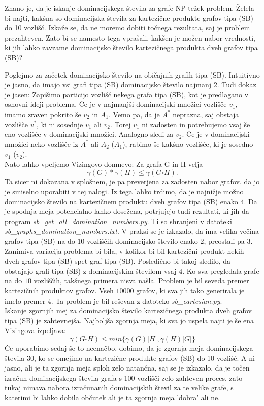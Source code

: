 \documentclass{article}
\begin{document}
Znano je, da je iskanje dominacijskega števila za grafe NP-težek problem. Želela bi najti, kakšna so dominacijska števila za kartezične produkte grafov tipa (SB) do 10 vozlišč. Izkaže se, da ne moremo dobiti točnega rezultata, saj je problem prezahteven. Zato bi se namesto tega vprašali, kakšen je možen nabor vrednosti, ki jih lahko zavzame dominacijsko število kartezičnega produkta dveh grafov tipa (SB)? 

Poglejmo za začetek dominacijsko število na običajnih grafih tipa (SB).
Intuitivno je jasno, da imajo vsi grafi tipa (SB) dominacijsko število najmanj 2. Tudi dokaz je jasen:
Zapišimo particijo vozlišč nekega grafa tipa (SB), kot je predlagano v osnovni ideji problema.
Če je v najmanjši dominacijski množici vozlišče $v_1$, imamo zraven pokrito še $v_2$ in 
$A_1$. Vemo pa, da je $A^*$ neprazna, saj obstaja vozlišče $v^*$, ki ni 
sosednje $v_1$ ali $v_2$. Torej $v_1$ ni zadosten in potrebujemo vsaj še eno vozlišče v dominacijski množici.
Analogno sledi za $v_2$. Če je v dominacijski množici neko vozlišče iz $A^*$ ali $A_2$ ($A_1$), rabimo še kakšno
vozlišče, ki je sosedno $v_1$ ($v_2$).  
\\
Nato lahko vpeljemo Vizingovo domnevo: Za grafa G in H velja
$$ \gamma(G)*\gamma(H) \leq \gamma(G\square H). $$
Ta sicer ni dokazana v splošnem, je pa preverjena za zadosten nabor grafov, da jo je smiselno uporabiti v 
tej nalogi.
Iz tega lahko trdimo, da je najnižje možno dominacijsko število na 
kartezičnem produktu dveh grafov tipa (SB) enako $4$. Da je spodnja meja potencialno lahko dosežena, potrjujejo tudi rezultati, ki jih da program 
\textit{sb\_get\_all\_domination\_numbers.py}. Ti so shranjeni v datoteki \textit{sb\_graphs\_domination\_numbers.txt}.
V praksi se je izkazalo, da ima velika večina grafov tipa (SB) na do $10$
vozliščih dominacijsko število enako $2$, preostali pa $3$.
\\
Zanimiva variacija problema bi bila, v kolikor bi bil kartezični produkt nekih
dveh grafov tipa (SB) spet graf tipa (SB). Posledično bi takoj sledilo, da obstajajo 
grafi tipa (SB) z dominacijskim številom vsaj $4$. Ko sva pregledala grafe na do $10$ vozliščih, 
takšnega primera nisva našla. Problem je bil seveda premer kartezičnih produktov grafov. Vseh $10000$ grafov, ki 
sva jih tako generirala je imelo premer $4$. Ta problem je bil reševan z datoteko \textit{sb\_cartesian.py}.
\\
Iskanje zgornjih mej za dominacijsko število kartezičnega produkta dveh grafov tipa (SB) je zahtevnejša.
Najboljša zgornja meja, ki sva jo uspela najti je še ena Vizingova izpeljava:
$$ \gamma(G\square H) \leq min\{\gamma(G)\lvert H \rvert, \gamma(H)\lvert G \rvert\}$$
Če uporabimo sedaj še to neenačbo, dobimo, da je zgornja meja dominacijskega števila 30, ko se omejimo na kartezične produkte grafov (SB) do 10 vozlišč. A ni jasno, ali je ta zgornja meja sploh zelo natančna, saj se je izkazalo, da je točen izračun dominacijskega števila grafa s 100 vozlišči zelo zahteven proces, zato tukaj nimava nabora izračunanih dominacijskih števil za te velike grafe, s katerimi bi lahko dobila občutek ali je ta zgornja meja 'dobra' ali ne.
\end{document}
